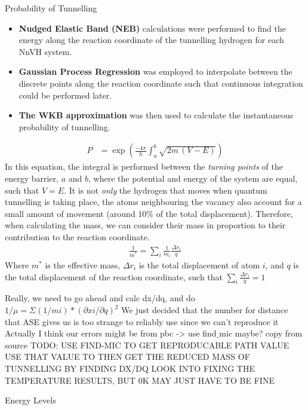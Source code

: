 \documentclass[final]{beamer}
\newlength{\colwidth}
\begin{document}
\begin{frame}[t]
\begin{columns}[t]
\begin{column}{\colwidth}
\begin{block}{Probability of Tunnelling}
    \begin{itemize}
      \item \textbf{Nudged Elastic Band (NEB)} calculations were performed to find the energy along the reaction coordinate of the tunnelling hydrogen for each NnVH system.
      \item \textbf{Gaussian Process Regression} was employed to interpolate between the discrete points along the reaction coordinate such that continuous integration could be performed later.
      \item \textbf{The WKB approximation} was then used to calculate the instantaneous probability of tunnelling.  
    \end{itemize}
    \begin{align*}        
        P &= \exp \left(\frac{-4\pi}{h}\int_a^b \sqrt{2m\,(V-E)}  \right)
    \end{align*}
    In this equation, the integral is performed between the \emph{turning points} of the energy barrier, $a$ and $b$, where the potential and energy of the system are equal, such that $V = E$. 
    It is not \emph{only} the hydrogen that moves when quantum tunnelling is taking place, the atoms neighbouring the vacancy also account for a small amount of movement (around 10\% of the total displacement).
    Therefore, when calculating the mass, we can consider their mass in proportion to their contribution to the reaction coordinate. 
    \begin{align*}
        \frac{1}{m^*} = \sum_i \frac{1}{m_i} \frac{\Delta r_i}{q} 
    \end{align*}
    Where $m^*$ is the effective mass, $\Delta r_i$ is the total displacement of atom $i$, and $q$ is the total displacement of the reaction coordinate, such that $\sum_i \frac{\Delta r_i}{q} = 1$

    Really, we need to go ahead and calc dx/dq, and do $1/μ = Σ(1/mi) * (∂xi/∂q)^2$
    We just decided that the number for distance that ASE gives us is too strange to reliably use since we can't reproduce it 
    Actually I think our errors might be from pbc -> use find$\_$mic maybe? copy from source
    TODO: USE FIND-MIC TO GET REPRODUCABLE PATH VALUE
          USE THAT VALUE TO THEN GET THE REDUCED MASS OF TUNNELLING BY FINDING DX/DQ
          LOOK INTO FIXING THE TEMPERATURE RESULTS, BUT 0K MAY JUST HAVE TO BE FINE
    
  \end{block}

  \begin{block}{Energy Levels}


\end{block}
\end{column}
\end{columns}
\end{frame}
\end{document}
